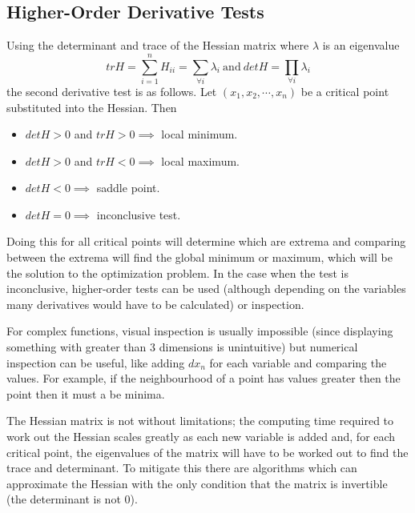 \documentclass[10pt,a4paper]{report}
\begin{document}
			\subsection{Higher-Order Derivative Tests}
				Using the determinant and trace of the Hessian matrix where $\lambda$ is an eigenvalue
				\begin{equation}
					trH = \sum_{i=1}^n H_{ii} = \sum_{\forall i} \lambda_i \ \text{and} \ detH = \prod_{\forall i} \lambda_i
				\end{equation}
				the second derivative test is as follows.
				Let $(x_1,x_2,\cdots,x_n)$ be a critical point substituted into the Hessian. Then \autocite{SecondDerivativeTest}
				\begin{itemize}
					\item $detH > 0$ and $trH > 0 \implies$ local minimum.
					\item $detH > 0$ and $trH < 0 \implies$ local maximum.
					\item  $detH < 0 \implies$ saddle point.
					\item $detH = 0 \implies$ inconclusive test.
				\end{itemize}
				Doing this for all critical points will determine which are extrema and comparing between the extrema will find the global
				minimum or maximum, which will be the solution to the optimization problem. In the case when the test is inconclusive, higher-order
				tests \autocite{ExtremumTest} can be used (although depending on the variables many derivatives would have to be calculated) or inspection. \par
				For complex functions, visual inspection is usually impossible (since displaying something with greater than 3 dimensions is unintuitive) but numerical inspection can be useful, like
				adding $dx_n$ for each variable and comparing the values. For example, if the neighbourhood of a point has values greater then the point then it must a be minima. \par
				The Hessian matrix is not without limitations; the computing time required to work out the Hessian scales greatly as each new variable is added and, for each critical
				point, the eigenvalues of the matrix will have to be worked out to find the trace and determinant. To mitigate this there are algorithms which can approximate the Hessian
				with the only condition that the matrix is invertible (the determinant is not 0).
\end{document}

